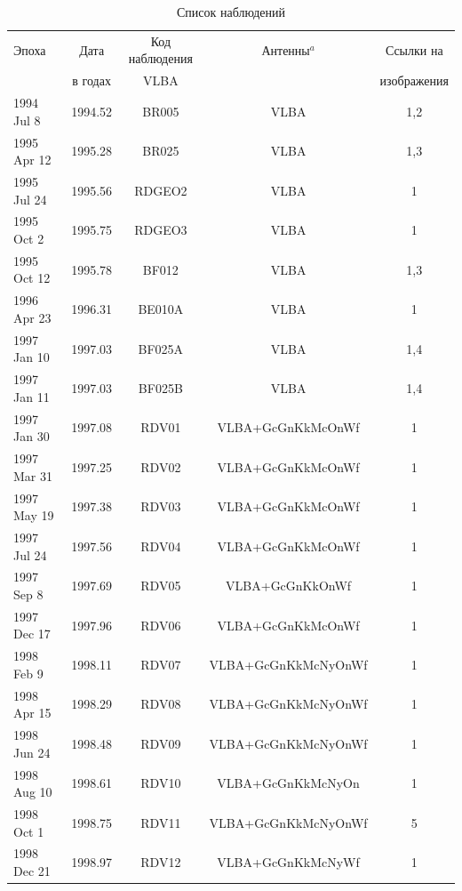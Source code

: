 \begin{table}
\tiny
\caption{Список наблюдений}
\label{tab:rdv_obstab}
\centering
\begin{SingleSpace}
\begin{tabular}{lcccc}
\toprule
Эпоха & Дата    & Код наблюдения & Антенны$^{a}$ & Ссылки на \\
      & в годах & VLBA           &               & изображения \\
\midrule
1994 Jul 8  & 1994.52 & BR005  & VLBA                      & 1,2 \\
1995 Apr 12 & 1995.28 & BR025  & VLBA                      & 1,3 \\
1995 Jul 24 & 1995.56 & RDGEO2 & VLBA                      & 1   \\
1995 Oct 2  & 1995.75 & RDGEO3 & VLBA                      & 1   \\
1995 Oct 12 & 1995.78 & BF012  & VLBA                      & 1,3 \\
1996 Apr 23 & 1996.31 & BE010A & VLBA                      & 1   \\
1997 Jan 10 & 1997.03 & BF025A & VLBA                      & 1,4 \\
1997 Jan 11 & 1997.03 & BF025B & VLBA                      & 1,4 \\
1997 Jan 30 & 1997.08 & RDV01  & VLBA+GcGnKkMcOnWf         & 1   \\
1997 Mar 31 & 1997.25 & RDV02  & VLBA+GcGnKkMcOnWf         & 1   \\
1997 May 19 & 1997.38 & RDV03  & VLBA+GcGnKkMcOnWf         & 1   \\
1997 Jul 24 & 1997.56 & RDV04  & VLBA+GcGnKkMcOnWf         & 1   \\
1997 Sep 8  & 1997.69 & RDV05  & VLBA+GcGnKkOnWf           & 1   \\
1997 Dec 17 & 1997.96 & RDV06  & VLBA+GcGnKkMcOnWf         & 1   \\
1998 Feb 9  & 1998.11 & RDV07  & VLBA+GcGnKkMcNyOnWf       & 1   \\
1998 Apr 15 & 1998.29 & RDV08  & VLBA+GcGnKkMcNyOnWf       & 1   \\
1998 Jun 24 & 1998.48 & RDV09  & VLBA+GcGnKkMcNyOnWf       & 1   \\
1998 Aug 10 & 1998.61 & RDV10  & VLBA+GcGnKkMcNyOn         & 1   \\
1998 Oct 1  & 1998.75 & RDV11  & VLBA+GcGnKkMcNyOnWf       & 5   \\
1998 Dec 21 & 1998.97 & RDV12  & VLBA+GcGnKkMcNyWf         & 1   \\

\end{tabular}
\end{SingleSpace}
\end{table}
